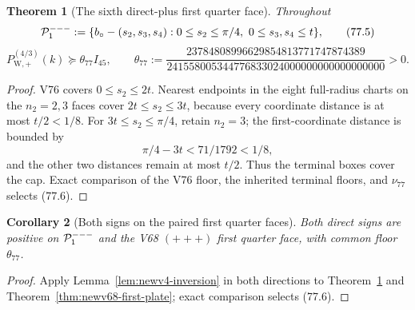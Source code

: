 \documentclass[11pt,oneside]{article}
\newtheorem{theorem}{Theorem}[section]
\newtheorem{corollary}[theorem]{Corollary}
\theoremstyle{definition}
\theoremstyle{remark}
\begin{document}
\begin{theorem}[The sixth direct-plus first quarter face]
\label{thm:newv77-first-face}
Throughout
\[
 {\cal P}^{---}_1:=
 \{b_\circ-(s_2,s_3,s_4):
   0\le s_2\le\pi/4,\ 0\le s_3,s_4\le t\},             \tag{77.5}
\]
\[
 P_{\mathrm W,+}^{(4/3)}(k)
 \succeq\theta_{77}I_{45},\qquad
 \theta_{77}:=
 \frac{23784808996629854813771747874389}
 {241558005344776833024000000000000000000}>0.          \tag{77.6}
\]
\end{theorem}

\begin{proof}
V76 covers \(0\le s_2\le2t\).  Nearest endpoints in the eight
full-radius charts on the \(n_2=2,3\) faces cover
\(2t\le s_2\le3t\), because every coordinate distance is at most
\(t/2<1/8\).  For \(3t\le s_2\le\pi/4\), retain \(n_2=3\); the
first-coordinate distance is bounded by
\[
 \pi/4-3t<71/1792<1/8,                                \tag{77.7}
\]
and the other two distances remain at most \(t/2\).  Thus the
terminal boxes cover the cap.  Exact comparison of the V76 floor,
the inherited terminal floors, and \(\nu_{77}\) selects (77.6).
\end{proof}

\begin{corollary}[Both signs on the paired first quarter faces]
\label{cor:newv77-paired-faces}
Both direct signs are positive on \({\cal P}^{---}_1\) and the V68
\((+++)\) first quarter face, with common floor \(\theta_{77}\).
\end{corollary}

\begin{proof}
Apply Lemma~\ref{lem:newv4-inversion} in both directions to
Theorem~\ref{thm:newv77-first-face} and
Theorem~\ref{thm:newv68-first-plate}; exact comparison
selects (77.6).
\end{proof}
\end{document}
